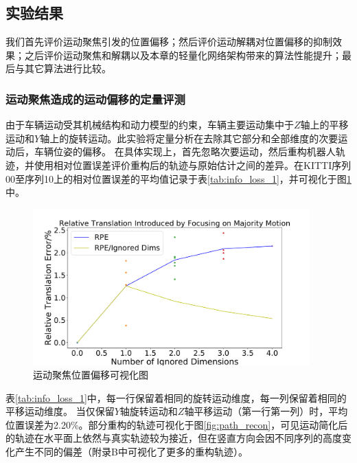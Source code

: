 \subsection{实验结果}
我们首先评价运动聚焦引发的位置偏移；然后评价运动解耦对位置偏移的抑制效果；之后评价运动聚焦和解耦以及本章的轻量化网络架构带来的算法性能提升；最后与其它算法进行比较。

\subsubsection{运动聚焦造成的运动偏移的定量评测}
\label{sec:info_loss}
由于车辆运动受其机械结构和动力模型的约束，车辆主要运动集中于$Z$轴上的平移运动和$Y$轴上的旋转运动。此实验将定量分析在去除其它部分和全部维度的次要运动后，车辆位姿的偏移。
在具体实现上，首先忽略次要运动，然后重构机器人轨迹，并使用相对位置误差评价重构后的轨迹与原始估计之间的差异。在KITTI序列00至序列10上的相对位置误差的平均值记录于表\ref{tab:info_loss_1}，并可视化于图\ref{fig:info_loss}中。

\begin{figure}[ht]
    \centering
    \includegraphics[width=0.95\textwidth]{datavo/info_loss.pdf}
    \caption{运动聚焦位置偏移可视化图}
    \label{fig:info_loss}
\end{figure}
表\ref{tab:info_loss_1}中，每一行保留着相同的旋转运动维度，每一列保留着相同的平移运动维度。 当仅保留$Y$轴旋转运动和$Z$轴平移运动（第一行第一列）时，平均位置误差为2.20\%。部分重构的轨迹可视化于图\ref{fig:path_recon}，可见运动简化后的轨迹在水平面上依然与真实轨迹较为接近，但在竖直方向会因不同序列的高度变化产生不同的偏差（附录B中可视化了更多的重构轨迹）。

